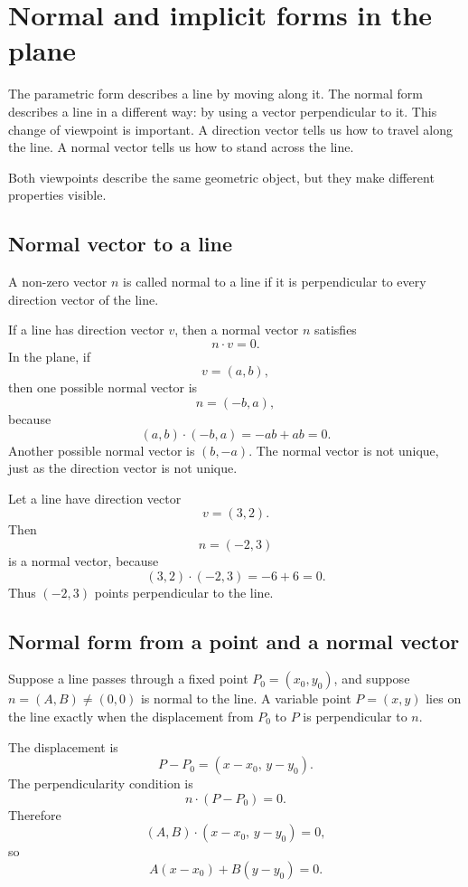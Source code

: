 \section{Normal and implicit forms in the plane}

The parametric form describes a line by moving along it. The normal form describes a line in a different way: by using a vector perpendicular to it. This change of viewpoint is important. A direction vector tells us how to travel along the line. A normal vector tells us how to stand across the line.

Both viewpoints describe the same geometric object, but they make different properties visible.

\subsection*{Normal vector to a line}

A non-zero vector \(n\) is called normal to a line if it is perpendicular to every direction vector of the line.

If a line has direction vector \(v\), then a normal vector \(n\) satisfies
\[
n\cdot v=0.
\]
In the plane, if
\[
v=(a,b),
\]
then one possible normal vector is
\[
n=(-b,a),
\]
because
\[
(a,b)\cdot(-b,a)=-ab+ab=0.
\]
Another possible normal vector is \((b,-a)\). The normal vector is not unique, just as the direction vector is not unique.

\begin{examplebox}
Let a line have direction vector
\[
v=(3,2).
\]
Then
\[
n=(-2,3)
\]
is a normal vector, because
\[
(3,2)\cdot(-2,3)=-6+6=0.
\]
Thus \((-2,3)\) points perpendicular to the line.
\end{examplebox}

\subsection*{Normal form from a point and a normal vector}

Suppose a line passes through a fixed point \(P_0=(x_0,y_0)\), and suppose \(n=(A,B)\ne(0,0)\) is normal to the line. A variable point \(P=(x,y)\) lies on the line exactly when the displacement from \(P_0\) to \(P\) is perpendicular to \(n\).

The displacement is
\[
P-P_0=(x-x_0,\,y-y_0).
\]
The perpendicularity condition is
\[
n\cdot(P-P_0)=0.
\]
Therefore
\[
(A,B)\cdot(x-x_0,\,y-y_0)=0,
\]
so
\[
A(x-x_0)+B(y-y_0)=0.
\]

